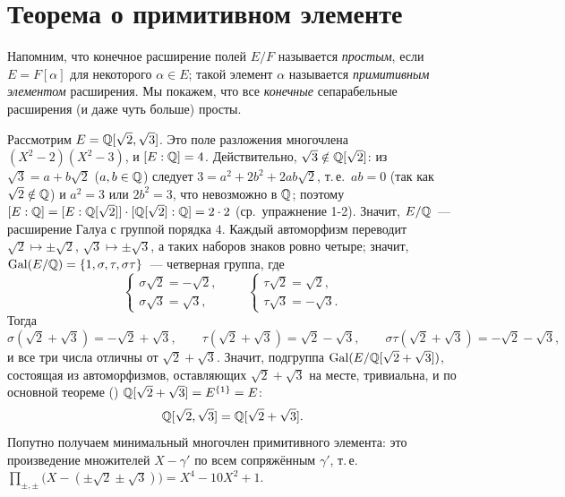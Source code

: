 \makeatletter
{}
\makeatother
\section{Теорема о примитивном элементе}

Напомним, что конечное расширение полей $E/F$ называется \emph{простым}, если $E=F[\alpha]$ для некоторого $\alpha\in E$;
такой элемент $\alpha$ называется \emph{примитивным элементом} расширения. Мы покажем, что все \emph{конечные}
сепарабельные расширения (и даже чуть больше) просты.

\begin{example}
Рассмотрим $E=\mathbb Q[\sqrt2,\sqrt3]$. Это поле разложения многочлена $(X^2-2)(X^2-3)$, и $[E:\mathbb Q]=4$. Действительно,
$\sqrt3\notin\mathbb Q[\sqrt2]$: из $\sqrt3=a+b\sqrt2$ ($a,b\in\mathbb Q$) следует $3=a^2+2b^2+2ab\sqrt2$, т.\,е.\ $ab=0$ (так как
$\sqrt2\notin\mathbb Q$) и $a^2=3$ или $2b^2=3$, что невозможно в $\mathbb Q$; поэтому $[E:\mathbb Q]=[E:\mathbb Q[\sqrt2]]\cdot[\mathbb Q[\sqrt2]:\mathbb Q]=2\cdot2$
(ср.\ упражнение 1-2). Значит, $E/\mathbb Q$~--- расширение Галуа с группой порядка $4$. Каждый автоморфизм переводит $\sqrt2\mapsto\pm\sqrt2$,
$\sqrt3\mapsto\pm\sqrt3$, а таких наборов знаков ровно четыре; значит, $\operatorname{Gal}(E/\mathbb Q)=\{1,\sigma,\tau,\sigma\tau\}$~---
четверная группа, где
\[
\begin{cases}\sigma\sqrt2=-\sqrt2,\\ \sigma\sqrt3=\sqrt3,\end{cases}\qquad
\begin{cases}\tau\sqrt2=\sqrt2,\\ \tau\sqrt3=-\sqrt3.\end{cases}
\]
Тогда
\[
\sigma(\sqrt2+\sqrt3)=-\sqrt2+\sqrt3,\qquad \tau(\sqrt2+\sqrt3)=\sqrt2-\sqrt3,\qquad
\sigma\tau(\sqrt2+\sqrt3)=-\sqrt2-\sqrt3,
\]
и все три числа отличны от $\sqrt2+\sqrt3$. Значит, подгруппа $\operatorname{Gal}(E/\mathbb Q[\sqrt2+\sqrt3])$, состоящая из автоморфизмов,
оставляющих $\sqrt2+\sqrt3$ на месте, тривиальна, и по основной теореме () $\mathbb Q[\sqrt2+\sqrt3]=E^{\{1\}}=E$:
\[
\mathbb Q[\sqrt2,\sqrt3]=\mathbb Q[\sqrt2+\sqrt3].
\]
Попутно получаем минимальный многочлен примитивного элемента: это произведение множителей $X-\gamma'$ по всем
сопряжённым $\gamma'$, т.\,е.\ $\prod_{\pm,\pm}\bigl(X-(\pm\sqrt2\pm\sqrt3)\bigr)=X^4-10X^2+1$.
\end{example}

